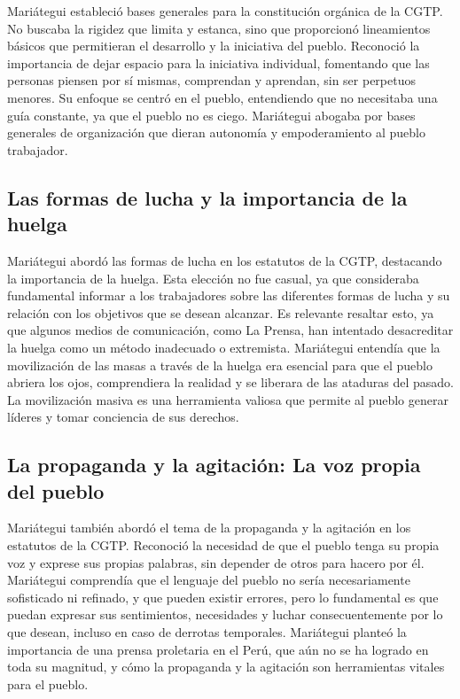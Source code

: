 \documentclass[
  jou,
  floatsintext,
  longtable,
  a4paper,
  nolmodern,
  notxfonts,
  notimes,
  12pt,
  colorlinks=true,linkcolor=blue,citecolor=blue,urlcolor=blue]{apa7}
\begin{document}
Mariátegui estableció bases generales para la constitución orgánica de
la CGTP. No buscaba la rigidez que limita y estanca, sino que
proporcionó lineamientos básicos que permitieran el desarrollo y la
iniciativa del pueblo. Reconoció la importancia de dejar espacio para la
iniciativa individual, fomentando que las personas piensen por sí
mismas, comprendan y aprendan, sin ser perpetuos menores. Su enfoque se
centró en el pueblo, entendiendo que no necesitaba una guía constante,
ya que el pueblo no es ciego. Mariátegui abogaba por bases generales de
organización que dieran autonomía y empoderamiento al pueblo trabajador.

\subsection{Las formas de lucha y la importancia de la
huelga}\label{las-formas-de-lucha-y-la-importancia-de-la-huelga}

Mariátegui abordó las formas de lucha en los estatutos de la CGTP,
destacando la importancia de la huelga. Esta elección no fue casual, ya
que consideraba fundamental informar a los trabajadores sobre las
diferentes formas de lucha y su relación con los objetivos que se desean
alcanzar. Es relevante resaltar esto, ya que algunos medios de
comunicación, como La Prensa, han intentado desacreditar la huelga como
un método inadecuado o extremista. Mariátegui entendía que la
movilización de las masas a través de la huelga era esencial para que el
pueblo abriera los ojos, comprendiera la realidad y se liberara de las
ataduras del pasado. La movilización masiva es una herramienta valiosa
que permite al pueblo generar líderes y tomar conciencia de sus
derechos.

\subsection{La propaganda y la agitación: La voz propia del
pueblo}\label{la-propaganda-y-la-agitaciuxf3n-la-voz-propia-del-pueblo}

Mariátegui también abordó el tema de la propaganda y la agitación en los
estatutos de la CGTP. Reconoció la necesidad de que el pueblo tenga su
propia voz y exprese sus propias palabras, sin depender de otros para
hacero por él. Mariátegui comprendía que el lenguaje del pueblo no sería
necesariamente sofisticado ni refinado, y que pueden existir errores,
pero lo fundamental es que puedan expresar sus sentimientos, necesidades
y luchar consecuentemente por lo que desean, incluso en caso de derrotas
temporales. Mariátegui planteó la importancia de una prensa proletaria
en el Perú, que aún no se ha logrado en toda su magnitud, y cómo la
propaganda y la agitación son herramientas vitales para el pueblo.
\end{document}
